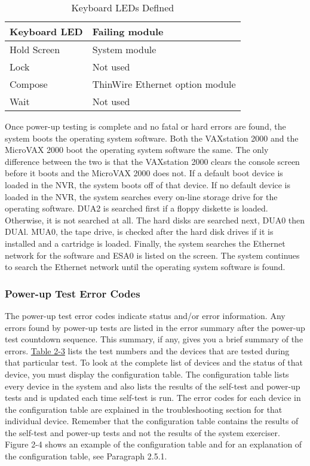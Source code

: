 \begin{table}
\label{table:2-2}
\caption{Keyboard LEDs Deflned}
\begin{tabularx}{\textwidth}{l l}
\hline
\textbf{Keyboard LED} & \textbf{Failing module}\\
\hline
Hold Screen & System module \\
Lock & Not used \\
Compose & ThinWire Ethernet option module \\
Wait & Not used \\
\hline
\end{tabularx}
\end{table}

Once power-up testing is complete and no fatal or hard errors are found, the
system boots the operating system software. Both the VAXstation 2000 and
the MicroVAX 2000 boot the operating system software the same. The only
difference between the two is that the VAXstation 2000 clears the console
screen before it boots and the MicroVAX 2000 does not. If a default boot
device is loaded in the NVR, the system boots off of that device. If no
default device is loaded in the NVR, the system searches every on-line
storage drive for the operating software. DUA2 is searched first if a floppy
diskette is loaded. Otherwise, it is not searched at all. The hard disks are
searched next, DUA0 then DUAl. MUA0, the tape drive, is checked after
the hard disk drives if it is installed and a cartridge is loaded. Finally, the
system searches the Ethernet network for the software and ESA0 is listed
on the screen. The system continues to search the Ethernet network until
the operating system software is found.
\newpage
\subsubsection{Power-up Test Error Codes}

The power-up test error codes indicate status and/or error information. Any
errors found by power-up tests are listed in the error summary after the
power-up test countdown sequence. This summary, if any, gives you a brief
summary of the errors. \hyperref[table:2-3]{Table 2-3} lists the test numbers and the devices that
are tested during that particular test. To look at the complete list of devices
and the status of that device, you must display the configuration table. The
configuration table lists every device in the system and also lists the results
of the self-test and power-up tests and is updated each time self-test is run.
The error codes for each device in the configuration table are explained in
the troubleshooting section for that individual device. Remember that the
configuration table contains the results of the self-test and power-up tests
and not the results of the system exerciser. Figure 2-4 shows an example
of the configuration table and for an explanation of the configuration table,
see Paragraph 2.5.1.


